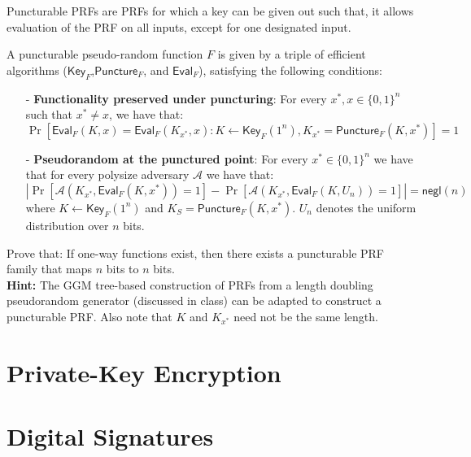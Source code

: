 \documentclass[12pt]{tufte-book}
\begin{document}
\begin{exercise} Puncturable PRFs are PRFs for which a key can be given out such that, it allows evaluation of the PRF on all inputs, except for one designated input.

\newcommand{\negl}{\mathsf{negl}}
\newcommand{\A}{\mathcal{A}}
\newcommand{\F}{F}
\newcommand{\KeyF}{\mathsf{Key}_{\F}}
\newcommand{\PunctureF}{\mathsf{Puncture}_{\F}}
\newcommand{\EvalF}{\mathsf{Eval}_{\F}}


A puncturable pseudo-random function $\F$ is given by a triple of efficient algorithms ($\KeyF$,$\PunctureF$, and $\EvalF$), satisfying the following conditions:
\begin{itemize}
\item[-] \textbf{Functionality preserved under puncturing}: For every $x^*, x \in \{0,1\}^{n}$ such that $x^* \neq x$, we have that:
    $$\Pr[\EvalF(K,x) = \EvalF(K_{x^*},x) : K \gets \KeyF(1^n), K_{x^*} = \PunctureF(K,x^*)] = 1$$
\item[-] \textbf{Pseudorandom at the punctured point}: For every $x^*\in \{0,1\}^n$ we have that for every polysize adversary $\A$ we have that:
    $$|\Pr[\A(K_{x^*}, \EvalF(K,x^*)) = 1] - \Pr[\A(K_{x^*}, \EvalF(K,U_n)) = 1]|= \negl(n)$$
    where $K \gets \KeyF(1^n)$ and $K_S = \PunctureF(K,x^*)$. $U_n$ denotes the uniform distribution over $n$ bits.
\end{itemize}

Prove that: If one-way functions exist, then there exists a puncturable PRF family that maps $n$ bits to $n$ bits. \\ 
\textbf{Hint:} The GGM tree-based construction of PRFs from a length doubling pseudorandom generator (discussed in class) can be adapted to construct a puncturable PRF. Also note that $K$ and $K_{x^*}$ need not be the same length.
\end{exercise}
 \chapter{Private-Key Encryption}   \newcommand{\Gen}{\mathsf{Gen}}
\newcommand{\Sign}{\mathsf{Sign}}
\newcommand{\Verify}{\mathsf{Verify}}
\newcommand{\negl}{\mathsf{negl}}
\newcommand{\abort}{\mathsf{abort}}
\newcommand{\Sampler}{\mathsf{Sampler}}
\newcommand{\Eval}{\mathsf{Eval}}
\renewcommand{\tag}{\mathsf{tag}}
\newcommand{\PRF}{\mathsf{PRF}}

\chapter{Digital Signatures}
\end{document}
